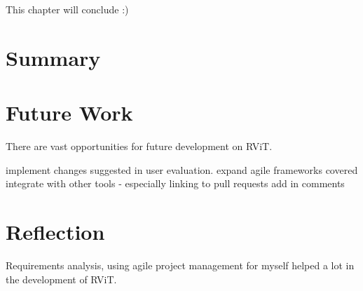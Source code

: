 \documentclass[l4proj.tex]{subfiles}
\begin{document}
  

This chapter will conclude :)

\section{Summary}

\section{Future Work}
There are vast opportunities for future development on RViT.

implement changes suggested in user evaluation.
expand agile frameworks covered
integrate with other tools - especially linking to pull requests
add in comments

\section{Reflection}
Requirements analysis, using agile project management for myself helped a lot in the development of RViT.
\end{document}
